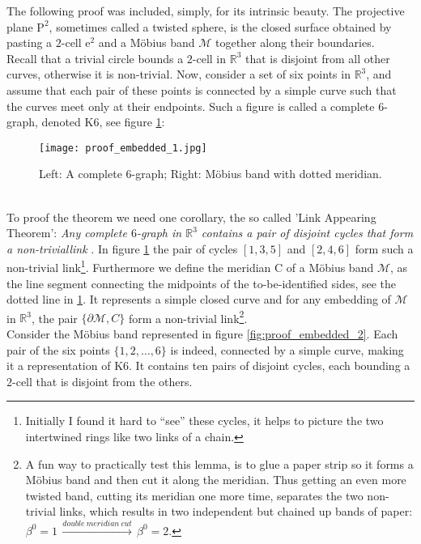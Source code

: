 The following proof was included, simply, for its intrinsic beauty.
The projective plane $\mathrm{P}^{2}$, sometimes called a twisted sphere, is the closed surface obtained by pasting a $2$-cell $\mathrm{e}^{2}$ and a Möbius band $\mathcal{M}$ together along their boundaries.\\
Recall that a trivial circle bounds a $2$-cell in $\mathbb{R}^{3}$ that is disjoint from all other curves, otherwise it is non-trivial.
Now, consider a set of six points in $\mathbb{R}^{3}$, and assume that each pair of these points is connected by a simple curve such that the curves meet only at their endpoints.
Such a figure is called a complete $6$-graph, denoted $\mathrm{K}6$, see figure \ref{fig:proof_embedded_1}:
\begin{figure}[ht]
\centering
\texttt{[image: proof\_embedded\_1.jpg]}
\caption{Left: A complete $6$-graph; Right: Möbius band with dotted meridian.}
\label{fig:proof_embedded_1}
\end{figure}\\
To proof the theorem we need one corollary, the so called 'Link Appearing Theorem': \textit{Any complete $6$-graph in $\mathbb{R}^{3}$ contains a pair of disjoint cycles that form a non-triviallink} \citep[proven by:][]{Conway1983}.
In figure \ref{fig:proof_embedded_1} the pair of cycles $[1,3,5]$ and $[2,4,6]$ form such a non-trivial link\footnote{ Initially I found it hard to ``see'' these cycles, it helps to picture the two intertwined rings like two links of a chain.}.
Furthermore we define the meridian $\mathrm{C}$ of a Möbius band $\mathcal{M}$, as the line segment connecting the midpoints of the to-be-identified sides, see the dotted line in \ref{fig:proof_embedded_1}.
It represents a simple closed curve and for any embedding of $\mathcal{M}$ in $\mathbb{R}^{3}$, the pair $\{\partial \mathcal{M}, C\}$ form a non-trivial link\footnote{ A fun way to practically test this lemma, is to glue a paper strip so it forms a Möbius band and then cut it along the meridian. Thus getting an even more twisted band, cutting its meridian one more time, separates the two non-trivial links, which results in two independent but chained up bands of paper: $\beta^{0}=1\, \xrightarrow{double~meridian~cut}\, \beta^{0}=2$.}.\\
Consider the Möbius band represented in figure \ref{fig:proof_embedded_2}.
Each pair of the six points $\{1, 2, \dots,6\}$ is indeed, connected by a simple curve, making it a representation of $\mathrm{K}6$.
It contains ten pairs of disjoint cycles, each bounding a $2$-cell that is disjoint from the others.
